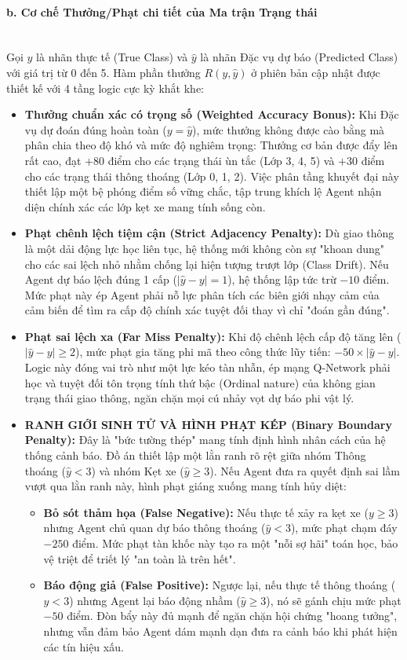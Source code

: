 \paragraph{b. Cơ chế Thưởng/Phạt chi tiết của Ma trận Trạng thái} \mbox{} \\
Gọi $y$ là nhãn thực tế (True Class) và $\hat{y}$ là nhãn Đặc vụ dự báo (Predicted Class) với giá trị từ 0 đến 5. Hàm phần thưởng $R(y, \hat{y})$ ở phiên bản cập nhật được thiết kế với 4 tầng logic cực kỳ khắt khe:
\begin{itemize}
    \item \textbf{Thưởng chuẩn xác có trọng số (Weighted Accuracy Bonus):} Khi Đặc vụ dự đoán đúng hoàn toàn ($y = \hat{y}$), mức thưởng không được cào bằng mà phân chia theo độ khó và mức độ nghiêm trọng: Thưởng cơ bản được đẩy lên rất cao, đạt $+80$ điểm cho các trạng thái ùn tắc (Lớp 3, 4, 5) và $+30$ điểm cho các trạng thái thông thoáng (Lớp 0, 1, 2). Việc phân tầng khuyết đại này thiết lập một bệ phóng điểm số vững chắc, tập trung khích lệ Agent nhận diện chính xác các lớp kẹt xe mang tính sống còn.
    \item \textbf{Phạt chênh lệch tiệm cận (Strict Adjacency Penalty):} Dù giao thông là một dải động lực học liên tục, hệ thống mới không còn sự "khoan dung" cho các sai lệch nhỏ nhằm chống lại hiện tượng trượt lớp (Class Drift). Nếu Agent dự báo lệch đúng 1 cấp ($|\hat{y} - y| = 1$), hệ thống lập tức trừ $-10$ điểm. Mức phạt này ép Agent phải nỗ lực phân tích các biên giới nhạy cảm của cảm biến để tìm ra cấp độ chính xác tuyệt đối thay vì chỉ "đoán gần đúng".
    \item \textbf{Phạt sai lệch xa (Far Miss Penalty):} Khi độ chênh lệch cấp độ tăng lên ($|\hat{y} - y| \ge 2$), mức phạt gia tăng phi mã theo công thức lũy tiến: $-50 \times |\hat{y} - y|$. Logic này đóng vai trò như một lực kéo tàn nhẫn, ép mạng Q-Network phải học và tuyệt đối tôn trọng tính thứ bậc (Ordinal nature) của không gian trạng thái giao thông, ngăn chặn mọi cú nhảy vọt dự báo phi vật lý.
    \item \textbf{RANH GIỚI SINH TỬ VÀ HÌNH PHẠT KÉP (Binary Boundary Penalty):} Đây là "bức tường thép" mang tính định hình nhân cách của hệ thống cảnh báo. Đồ án thiết lập một lằn ranh rõ rệt giữa nhóm Thông thoáng ($\hat{y} < 3$) và nhóm Kẹt xe ($\hat{y} \ge 3$). Nếu Agent đưa ra quyết định sai lầm vượt qua lằn ranh này, hình phạt giáng xuống mang tính hủy diệt:
    \begin{itemize}
        \item \textbf{Bỏ sót thảm họa (False Negative):} Nếu thực tế xảy ra kẹt xe ($y \ge 3$) nhưng Agent chủ quan dự báo thông thoáng ($\hat{y} < 3$), mức phạt chạm đáy $-250$ điểm. Mức phạt tàn khốc này tạo ra một "nỗi sợ hãi" toán học, bảo vệ triệt để triết lý "an toàn là trên hết".
        \item \textbf{Báo động giả (False Positive):} Ngược lại, nếu thực tế thông thoáng ($y < 3$) nhưng Agent lại báo động nhầm ($\hat{y} \ge 3$), nó sẽ gánh chịu mức phạt $-50$ điểm. Đòn bẩy này đủ mạnh để ngăn chặn hội chứng "hoang tưởng", nhưng vẫn đảm bảo Agent dám mạnh dạn đưa ra cảnh báo khi phát hiện các tín hiệu xấu.
    \end{itemize}
\end{itemize}

